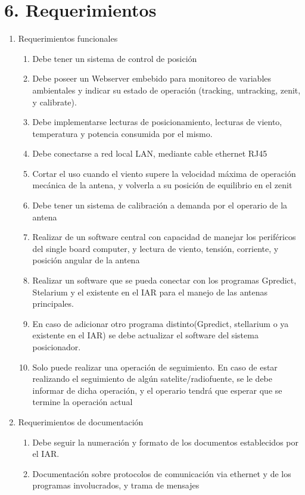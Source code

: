 \documentclass[11pt, %
codirector, %
]{charter}
\begin{document}
\section{6. Requerimientos}
\label{sec:requerimientos}

\begin{enumerate}
	\item Requerimientos funcionales
		\begin{enumerate}
			\item Debe tener un sistema de control de posición
			\item Debe poseer un Webserver embebido para monitoreo de variables ambientales y indicar su estado de operación (tracking, untracking, zenit, y calibrate). 
			\item Debe implementarse lecturas de posicionamiento, lecturas de viento, temperatura y potencia consumida por el mismo. 
			\item Debe conectarse a red local LAN, mediante cable ethernet RJ45 
			\item  Cortar el uso cuando el viento supere la velocidad máxima de operación mecánica de la antena, y volverla a su posición de equilibrio en el zenit 
			\item Debe tener un sistema de calibración a demanda por el operario de la antena 
			\item Realizar de un software central con capacidad de manejar los periféricos del single board computer, y lectura de viento, tensión, corriente, y posición angular de la antena
			\item Realizar un software que se pueda conectar con los programas Gpredict, Stelarium y el existente en el IAR para el manejo de las antenas principales. 
			\item En caso de adicionar otro programa distinto(Gpredict, stellarium o ya existente en el IAR) se debe actualizar el software del sistema posicionador. 
			\item Solo puede realizar una operación de seguimiento. En caso de estar realizando el seguimiento de algún satelite/radiofuente, se le debe informar de dicha operación, y el operario tendrá que esperar que se termine la operación actual  
		\end{enumerate}
	\item Requerimientos de documentación
		\begin{enumerate}
			\item Debe seguir la numeración y formato de los documentos establecidos por el IAR. 
			\item Documentación sobre protocolos de comunicación via ethernet y de los programas involucrados, y trama de mensajes 

\end{enumerate}
\end{enumerate}
\end{document}
